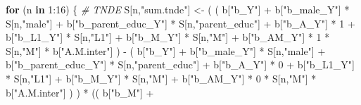\documentclass[
]{book}
\newenvironment{Shaded}{\begin{snugshade}}{\end{snugshade}}
\newcommand{\CommentTok}[1]{\textcolor[rgb]{0.56,0.35,0.01}{\textit{#1}}}
\newcommand{\ControlFlowTok}[1]{\textcolor[rgb]{0.13,0.29,0.53}{\textbf{#1}}}
\newcommand{\DecValTok}[1]{\textcolor[rgb]{0.00,0.00,0.81}{#1}}
\newcommand{\NormalTok}[1]{#1}
\newcommand{\OtherTok}[1]{\textcolor[rgb]{0.56,0.35,0.01}{#1}}
\newcommand{\SpecialCharTok}[1]{\textcolor[rgb]{0.00,0.00,0.00}{#1}}
\newcommand{\StringTok}[1]{\textcolor[rgb]{0.31,0.60,0.02}{#1}}
\begin{document}
\begin{Shaded}
\begin{Highlighting}[]
  \ControlFlowTok{for}\NormalTok{ (n }\ControlFlowTok{in} \DecValTok{1}\SpecialCharTok{:}\DecValTok{16}\NormalTok{) \{}
    \CommentTok{\# TNDE }
\NormalTok{    S[n,}\StringTok{"sum.tnde"}\NormalTok{] }\OtherTok{\textless{}{-}}\NormalTok{ ( ( b[}\StringTok{"b\_Y"}\NormalTok{] }\SpecialCharTok{+} 
\NormalTok{                             b[}\StringTok{"b\_male\_Y"}\NormalTok{] }\SpecialCharTok{*}\NormalTok{ S[n,}\StringTok{"male"}\NormalTok{] }\SpecialCharTok{+} 
\NormalTok{                             b[}\StringTok{"b\_parent\_educ\_Y"}\NormalTok{] }\SpecialCharTok{*}\NormalTok{ S[n,}\StringTok{"parent\_educ"}\NormalTok{] }\SpecialCharTok{+} 
\NormalTok{                             b[}\StringTok{"b\_A\_Y"}\NormalTok{] }\SpecialCharTok{*} \DecValTok{1} \SpecialCharTok{+} 
\NormalTok{                             b[}\StringTok{"b\_L1\_Y"}\NormalTok{] }\SpecialCharTok{*}\NormalTok{ S[n,}\StringTok{"L1"}\NormalTok{] }\SpecialCharTok{+}
\NormalTok{                             b[}\StringTok{"b\_M\_Y"}\NormalTok{] }\SpecialCharTok{*}\NormalTok{ S[n,}\StringTok{"M"}\NormalTok{] }\SpecialCharTok{+}
\NormalTok{                             b[}\StringTok{"b\_AM\_Y"}\NormalTok{] }\SpecialCharTok{*} \DecValTok{1} \SpecialCharTok{*}\NormalTok{ S[n,}\StringTok{"M"}\NormalTok{] }\SpecialCharTok{*}\NormalTok{ b[}\StringTok{"A.M.inter"}\NormalTok{] ) }\SpecialCharTok{{-}} 
\NormalTok{                           ( b[}\StringTok{"b\_Y"}\NormalTok{] }\SpecialCharTok{+} 
\NormalTok{                               b[}\StringTok{"b\_male\_Y"}\NormalTok{] }\SpecialCharTok{*}\NormalTok{ S[n,}\StringTok{"male"}\NormalTok{] }\SpecialCharTok{+} 
\NormalTok{                               b[}\StringTok{"b\_parent\_educ\_Y"}\NormalTok{] }\SpecialCharTok{*}\NormalTok{ S[n,}\StringTok{"parent\_educ"}\NormalTok{] }\SpecialCharTok{+} 
\NormalTok{                               b[}\StringTok{"b\_A\_Y"}\NormalTok{] }\SpecialCharTok{*} \DecValTok{0} \SpecialCharTok{+} 
\NormalTok{                               b[}\StringTok{"b\_L1\_Y"}\NormalTok{] }\SpecialCharTok{*}\NormalTok{ S[n,}\StringTok{"L1"}\NormalTok{] }\SpecialCharTok{+}
\NormalTok{                               b[}\StringTok{"b\_M\_Y"}\NormalTok{] }\SpecialCharTok{*}\NormalTok{ S[n,}\StringTok{"M"}\NormalTok{] }\SpecialCharTok{+} 
\NormalTok{                               b[}\StringTok{"b\_AM\_Y"}\NormalTok{] }\SpecialCharTok{*} \DecValTok{0} \SpecialCharTok{*}\NormalTok{ S[n,}\StringTok{"M"}\NormalTok{] }\SpecialCharTok{*}\NormalTok{ b[}\StringTok{"A.M.inter"}\NormalTok{] ) ) }\SpecialCharTok{*}
\NormalTok{      (( b[}\StringTok{"b\_M"}\NormalTok{] }\SpecialCharTok{+} 

\end{Highlighting}
\end{Shaded}
\end{document}
